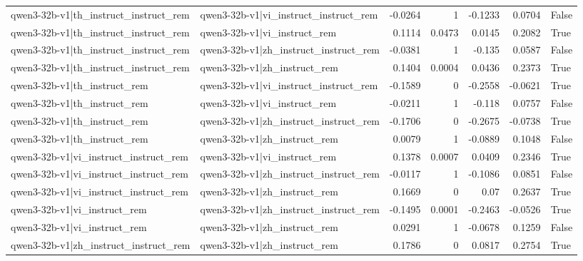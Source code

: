 \begin{table}
\begin{tabular}{l l r r r r l}
qwen3-32b-v1|th_instruct_instruct_rem & qwen3-32b-v1|vi_instruct_instruct_rem & -0.0264 & 1 & -0.1233 & 0.0704 & False \\
qwen3-32b-v1|th_instruct_instruct_rem & qwen3-32b-v1|vi_instruct_rem & 0.1114 & 0.0473 & 0.0145 & 0.2082 & True \\
qwen3-32b-v1|th_instruct_instruct_rem & qwen3-32b-v1|zh_instruct_instruct_rem & -0.0381 & 1 & -0.135 & 0.0587 & False \\
qwen3-32b-v1|th_instruct_instruct_rem & qwen3-32b-v1|zh_instruct_rem & 0.1404 & 0.0004 & 0.0436 & 0.2373 & True \\
qwen3-32b-v1|th_instruct_rem & qwen3-32b-v1|vi_instruct_instruct_rem & -0.1589 & 0 & -0.2558 & -0.0621 & True \\
qwen3-32b-v1|th_instruct_rem & qwen3-32b-v1|vi_instruct_rem & -0.0211 & 1 & -0.118 & 0.0757 & False \\
qwen3-32b-v1|th_instruct_rem & qwen3-32b-v1|zh_instruct_instruct_rem & -0.1706 & 0 & -0.2675 & -0.0738 & True \\
qwen3-32b-v1|th_instruct_rem & qwen3-32b-v1|zh_instruct_rem & 0.0079 & 1 & -0.0889 & 0.1048 & False \\
qwen3-32b-v1|vi_instruct_instruct_rem & qwen3-32b-v1|vi_instruct_rem & 0.1378 & 0.0007 & 0.0409 & 0.2346 & True \\
qwen3-32b-v1|vi_instruct_instruct_rem & qwen3-32b-v1|zh_instruct_instruct_rem & -0.0117 & 1 & -0.1086 & 0.0851 & False \\
qwen3-32b-v1|vi_instruct_instruct_rem & qwen3-32b-v1|zh_instruct_rem & 0.1669 & 0 & 0.07 & 0.2637 & True \\
qwen3-32b-v1|vi_instruct_rem & qwen3-32b-v1|zh_instruct_instruct_rem & -0.1495 & 0.0001 & -0.2463 & -0.0526 & True \\
qwen3-32b-v1|vi_instruct_rem & qwen3-32b-v1|zh_instruct_rem & 0.0291 & 1 & -0.0678 & 0.1259 & False \\
qwen3-32b-v1|zh_instruct_instruct_rem & qwen3-32b-v1|zh_instruct_rem & 0.1786 & 0 & 0.0817 & 0.2754 & True \\
\bottomrule
\end{tabular}
\end{table}
